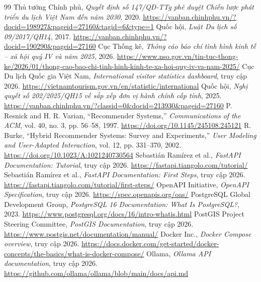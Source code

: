 \documentclass[12pt,a4paper,oneside]{report}
\begin{document}
\clearpage
{}
\begin{thebibliography}{99}
 Thủ tướng Chính phủ, \emph{Quyết định số 147/QĐ-TTg phê duyệt Chiến lược phát triển du lịch Việt Nam đến năm 2030}, 2020. \url{https://vanban.chinhphu.vn/?docid=198927\&pageid=27160\&tagid=6\&type=1}
 Quốc hội, \emph{Luật Du lịch số 09/2017/QH14}, 2017. \url{https://vanban.chinhphu.vn/?docid=190290\&pageid=27160}
 Cục Thống kê, \emph{Thông cáo báo chí tình hình kinh tế -- xã hội quý IV và năm 2025}, 2026. \url{https://www.nso.gov.vn/tin-tuc-thong-ke/2026/01/thong-cao-bao-chi-tinh-hinh-kinh-te-xa-hoi-quy-iv-va-nam-2025/}
 Cục Du lịch Quốc gia Việt Nam, \emph{International visitor statistics dashboard}, truy cập 2026. \url{https://vietnamtourism.gov.vn/en/statistic/international}
 Quốc hội, \emph{Nghị quyết số 202/2025/QH15 về sắp xếp đơn vị hành chính cấp tỉnh}, 2025. \url{https://vanban.chinhphu.vn/?classid=0\&docid=213930\&pageid=27160}
 P. Resnick and H. R. Varian, ``Recommender Systems,'' \emph{Communications of the ACM}, vol. 40, no. 3, pp. 56--58, 1997. \url{https://doi.org/10.1145/245108.245121}
 R. Burke, ``Hybrid Recommender Systems: Survey and Experiments,'' \emph{User Modeling and User-Adapted Interaction}, vol. 12, pp. 331--370, 2002. \url{https://doi.org/10.1023/A:1021240730564}
 Sebastián Ramírez et al., \emph{FastAPI Documentation: Tutorial}, truy cập 2026. \url{https://fastapi.tiangolo.com/tutorial/}
 Sebastián Ramírez et al., \emph{FastAPI Documentation: First Steps}, truy cập 2026. \url{https://fastapi.tiangolo.com/tutorial/first-steps/}
 OpenAPI Initiative, \emph{OpenAPI Specification}, truy cập 2026. \url{https://spec.openapis.org/oas/}
 PostgreSQL Global Development Group, \emph{PostgreSQL 16 Documentation: What Is PostgreSQL?}, 2023. \url{https://www.postgresql.org/docs/16/intro-whatis.html}
 PostGIS Project Steering Committee, \emph{PostGIS Documentation}, truy cập 2026. \url{https://www.postgis.net/documentation/manual/}
 Docker Inc., \emph{Docker Compose overview}, truy cập 2026. \url{https://docs.docker.com/get-started/docker-concepts/the-basics/what-is-docker-compose/}
 Ollama, \emph{Ollama API documentation}, truy cập 2026. \url{https://github.com/ollama/ollama/blob/main/docs/api.md}

\end{thebibliography}
\end{document}
